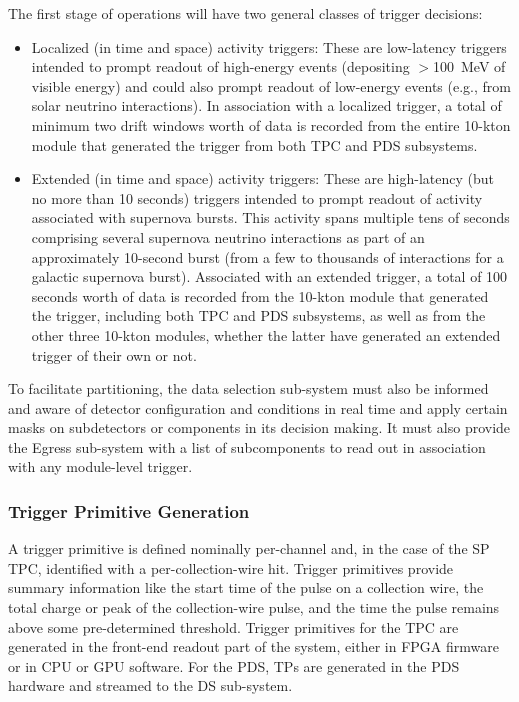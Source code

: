 The first
stage of operations will have two general classes of trigger decisions:
\begin{itemize}
 \item Localized (in time and space) activity triggers: These are
   low-latency triggers intended to prompt readout of
   high-energy events (depositing $>$100~MeV of visible energy) 
   and could also prompt readout of low-energy events
   (e.g., from solar neutrino interactions). In association with a
   localized trigger, a total of minimum two drift windows worth of data is recorded from
   the entire 10-kton module that generated the trigger from
   both TPC and PDS subsystems.   
\item Extended (in time and space) activity triggers: These are
  high-latency (but no more than 10 seconds) triggers intended to prompt readout of
  activity associated with supernova bursts. This activity spans multiple
  tens of seconds  comprising several supernova neutrino
  interactions as part of an approximately 10-second burst (from a few to
  thousands of interactions for a galactic supernova
  burst). Associated with an extended trigger, a total of \num{100}
  seconds worth of data is recorded from the 10-kton module that
  generated the trigger, including both TPC and PDS subsystems, as
  well as from the other three 10-kton modules, whether
  the latter have generated an extended trigger of their own or not.  
\end{itemize}

To facilitate partitioning, the data selection sub-system must also be
informed and aware of detector configuration and conditions in real
time and apply certain masks on subdetectors or components
in its decision making. It must also provide the Egress sub-system with a list of
subcomponents to read out in association
with any module-level trigger.

\subsubsection{Trigger Primitive Generation}
\label{sec:sp-daq:design-trigger-primitives}

A trigger primitive is defined nominally per-channel and,
in the case of the SP TPC, identified with a per-collection-wire
hit. Trigger primitives provide summary information
like the start time of the pulse on a collection wire, the total
charge or peak of the collection-wire pulse, and the time the pulse
remains above some pre-determined threshold. Trigger primitives for the
TPC are generated in the front-end readout part of the  
system, either in FPGA firmware or in CPU or GPU software. For the
PDS, TPs are generated in the PDS hardware and streamed to the 
DS sub-system.

